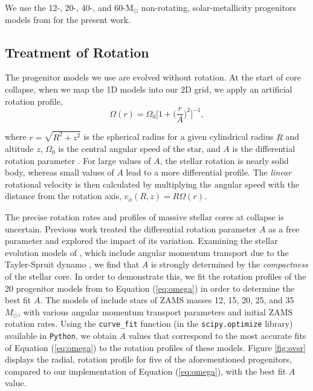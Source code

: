 \documentclass[twocolumn,times]{aastex62}  %
\newcommand{\Msun}{\ensuremath{\mathrm{M}_\odot}\xspace}
\begin{document}
We use the 12-, 20-, 40-, and 60-\Msun non-rotating, solar-metallicity progenitors models from \citet{Suk:2016} for the present work.

\subsection{Treatment of Rotation}




The progenitor models we use are evolved without rotation.
At the start of core collapse, when we map the 1D models into our 2D grid, we apply an artificial rotation profile,
\begin{equation}
    \Omega(r) = \Omega_0 \bigg[1 + \bigg(\frac{r}{A}\bigg)^2 \bigg]^{-1}, 
    \label{eq:omega}
\end{equation}

where $r = \sqrt{R^2 + z^2}$ is the spherical radius for a given cylindrical radius $R$ and altitude $z$, $\Omega_0$ is the central angular speed of the star, and $A$ is the differential rotation parameter \citep{eriguchi:1984}.  For large values of $A$, the stellar rotation is nearly solid body, whereas small values of $A$ lead to a more differential profile. 
The {\it linear} rotational velocity is then calculated by multiplying the angular speed with the distance from the rotation axis, $v_\phi (R, z) = R \Omega (r) $. 

The precise rotation rates and profiles of massive stellar cores at collapse is uncertain.
Previous work \citep[e.g.,][]{abdik:2014} treated the differential rotation parameter $A$ as a free parameter and explored the impact of its variation.
Examining the stellar evolution models of \citet{heger:2005}, which include angular momentum transport due to the Tayler-Spruit dynamo \citep{spruit:2002}, we find that $A$ is strongly determined by the {\it compactness} \citep{oconnor:2011} of the stellar core.
In order to demonstrate this, we fit the rotation profiles of the 20 progenitor models from \citet{heger:2005} to Equation (\ref{eq:omega}) in order to determine the best fit $A$.
The models of \citet{heger:2005} include stars of ZAMS masses 12, 15, 20, 25, and 35 $M_{\odot}$, with various angular momentum transport parameters and initial ZAMS rotation rates.  
Using the \texttt{curve\_fit} function (in the \texttt{scipy.optimize} library) available in \texttt{Python}, we obtain $A$ values that correspond to the most accurate fits of Equation (\ref{eq:omega}) to the rotation profiles of these models.  Figure \ref{fig:ovsr} displays the radial, rotation profile for five of the aforementioned progenitors, compared to our implementation of Equation (\ref{eq:omega}), with the best fit $A$ value.
\end{document}
